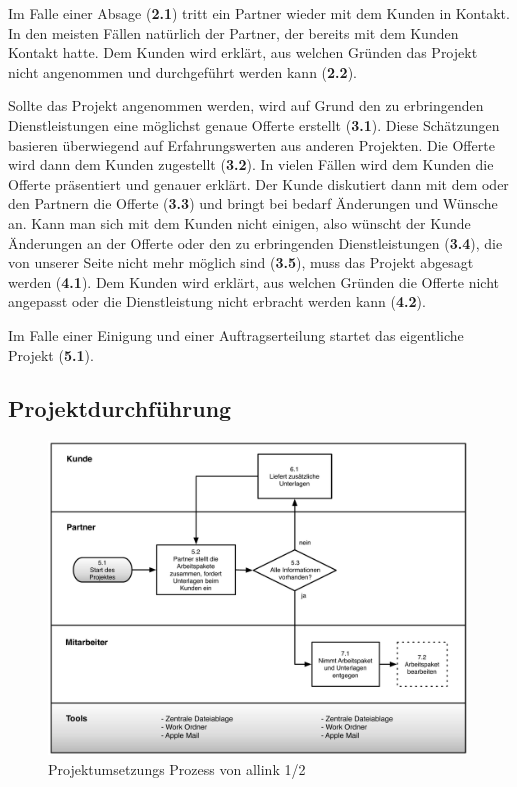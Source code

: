 Im Falle einer Absage (\textbf{2.1}) tritt ein Partner wieder mit dem Kunden in Kontakt.
In den meisten Fällen natürlich der Partner, der bereits mit dem Kunden Kontakt
hatte. Dem Kunden wird erklärt, aus welchen Gründen das Projekt nicht angenommen
und durchgeführt werden kann (\textbf{2.2}).

Sollte das Projekt angenommen werden, wird auf Grund den zu erbringenden
Dienstleistungen eine möglichst genaue Offerte erstellt (\textbf{3.1}). Diese Schätzungen
basieren überwiegend auf Erfahrungswerten aus anderen Projekten.
Die Offerte wird dann dem Kunden zugestellt (\textbf{3.2}). In vielen Fällen wird dem Kunden
die Offerte präsentiert und genauer erklärt.
Der Kunde diskutiert dann mit dem oder den Partnern die Offerte (\textbf{3.3}) und bringt
bei bedarf Änderungen und Wünsche an.
Kann man sich mit dem Kunden nicht einigen, also wünscht der Kunde Änderungen
an der Offerte oder den zu erbringenden Dienstleistungen (\textbf{3.4}), die von unserer Seite
nicht mehr möglich sind (\textbf{3.5}), muss das Projekt abgesagt werden (\textbf{4.1}).
Dem Kunden wird erklärt, aus welchen Gründen die Offerte nicht angepasst oder
die Dienstleistung nicht erbracht werden kann (\textbf{4.2}).

Im Falle einer Einigung und einer Auftragserteilung startet das eigentliche
Projekt (\textbf{5.1}).

\clearpage

\subsection{Projektdurchführung}

\begin{figure}[p]
\begin{center}
\includegraphics[width=0.99\textwidth,angle=0]{./bilder/analyse/02_ist_prozesse_arbeit_01.pdf}
\caption[Projektumsetzungs Prozess von allink 1/2]{Projektumsetzungs 
    Prozess von allink 1/2\footnotemark}
\label{pic:02_ist_prozesse_arbeit_01}
\end{center}
\end{figure}

